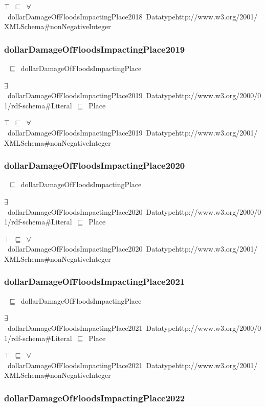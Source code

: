 \documentclass{article}
\begin{document}
\ensuremath{\top}~\ensuremath{\sqsubseteq}~\ensuremath{\forall}~dollarDamageOfFloodsImpactingPlace2018~Datatypehttp://www.w3.org/2001/XMLSchema#nonNegativeInteger

\subsubsection*{dollarDamageOfFloodsImpactingPlace2019}

~\ensuremath{\sqsubseteq}~dollarDamageOfFloodsImpactingPlace

\ensuremath{\exists}~dollarDamageOfFloodsImpactingPlace2019~Datatypehttp://www.w3.org/2000/01/rdf-schema#Literal~\ensuremath{\sqsubseteq}~Place

\ensuremath{\top}~\ensuremath{\sqsubseteq}~\ensuremath{\forall}~dollarDamageOfFloodsImpactingPlace2019~Datatypehttp://www.w3.org/2001/XMLSchema#nonNegativeInteger

\subsubsection*{dollarDamageOfFloodsImpactingPlace2020}

~\ensuremath{\sqsubseteq}~dollarDamageOfFloodsImpactingPlace

\ensuremath{\exists}~dollarDamageOfFloodsImpactingPlace2020~Datatypehttp://www.w3.org/2000/01/rdf-schema#Literal~\ensuremath{\sqsubseteq}~Place

\ensuremath{\top}~\ensuremath{\sqsubseteq}~\ensuremath{\forall}~dollarDamageOfFloodsImpactingPlace2020~Datatypehttp://www.w3.org/2001/XMLSchema#nonNegativeInteger

\subsubsection*{dollarDamageOfFloodsImpactingPlace2021}

~\ensuremath{\sqsubseteq}~dollarDamageOfFloodsImpactingPlace

\ensuremath{\exists}~dollarDamageOfFloodsImpactingPlace2021~Datatypehttp://www.w3.org/2000/01/rdf-schema#Literal~\ensuremath{\sqsubseteq}~Place

\ensuremath{\top}~\ensuremath{\sqsubseteq}~\ensuremath{\forall}~dollarDamageOfFloodsImpactingPlace2021~Datatypehttp://www.w3.org/2001/XMLSchema#nonNegativeInteger

\subsubsection*{dollarDamageOfFloodsImpactingPlace2022}
\end{document}

